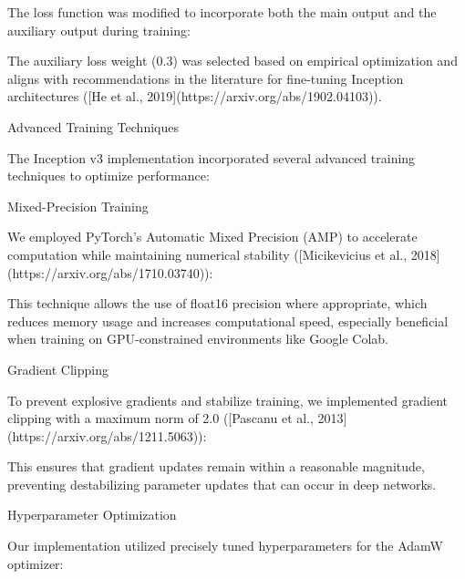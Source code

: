 \documentclass[a4paper,12pt]{article}
\begin{document}
The loss function was modified to incorporate both the main output and the auxiliary output during training:


The auxiliary loss weight (0.3) was selected based on empirical optimization and aligns with recommendations in the literature for fine-tuning Inception architectures ([He et al., 2019](https://arxiv.org/abs/1902.04103)).

Advanced Training Techniques

The Inception v3 implementation incorporated several advanced training techniques to optimize performance:

 Mixed-Precision Training

We employed PyTorch's Automatic Mixed Precision (AMP) to accelerate computation while maintaining numerical stability ([Micikevicius et al., 2018](https://arxiv.org/abs/1710.03740)):




This technique allows the use of float16 precision where appropriate, which reduces memory usage and increases computational speed, especially beneficial when training on GPU-constrained environments like Google Colab.

 Gradient Clipping

To prevent explosive gradients and stabilize training, we implemented gradient clipping with a maximum norm of 2.0 ([Pascanu et al., 2013](https://arxiv.org/abs/1211.5063)):


This ensures that gradient updates remain within a reasonable magnitude, preventing destabilizing parameter updates that can occur in deep networks.

 Hyperparameter Optimization

Our implementation utilized precisely tuned hyperparameters for the AdamW optimizer:
\end{document}
